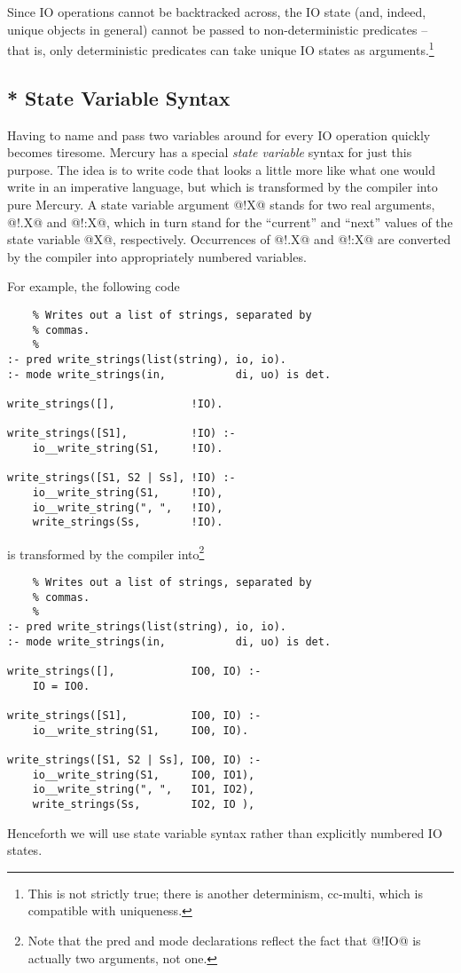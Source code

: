 \documentclass[a4paper,11pt,notitlepage,onecolumn]{article}
\begin{document}
Since IO operations cannot be backtracked across, the IO state
(and, indeed, unique objects in general) cannot be passed to
non-deterministic predicates -- that is, only deterministic
predicates can take unique IO states as arguments.\footnote{This is not strictly true; there is another
determinism, cc-multi, which is compatible with uniqueness.}

\subsection{* State Variable Syntax}

Having to name and pass two variables around for every IO
operation quickly becomes tiresome.  Mercury has a special
\emph{state variable} syntax for just this purpose.  The idea is to
write code that looks a little more like what one would write
in an imperative language, but which is transformed by the
compiler into pure Mercury.  A state variable argument @!X@
stands for two real arguments, @!.X@ and @!:X@, which in turn
stand for the ``current'' and ``next'' values of the state variable
@X@, respectively.  Occurrences of @!.X@ and @!:X@ are converted by
the compiler into appropriately numbered variables.

For example, the following code
\begin{verbatim}
    % Writes out a list of strings, separated by
    % commas.
    %
:- pred write_strings(list(string), io, io).
:- mode write_strings(in,           di, uo) is det.

write_strings([],            !IO).

write_strings([S1],          !IO) :-
    io__write_string(S1,     !IO).

write_strings([S1, S2 | Ss], !IO) :-
    io__write_string(S1,     !IO),
    io__write_string(", ",   !IO),
    write_strings(Ss,        !IO).
\end{verbatim}
is transformed by the compiler into\footnote{Note that the pred and mode declarations reflect
the fact that @!IO@ is actually two arguments, not one.}
\begin{verbatim}
    % Writes out a list of strings, separated by
    % commas.
    %
:- pred write_strings(list(string), io, io).
:- mode write_strings(in,           di, uo) is det.

write_strings([],            IO0, IO) :-
    IO = IO0.

write_strings([S1],          IO0, IO) :-
    io__write_string(S1,     IO0, IO).

write_strings([S1, S2 | Ss], IO0, IO) :-
    io__write_string(S1,     IO0, IO1),
    io__write_string(", ",   IO1, IO2),
    write_strings(Ss,        IO2, IO ),
\end{verbatim}
Henceforth we will use state variable syntax rather than
explicitly numbered IO states.
\end{document}
